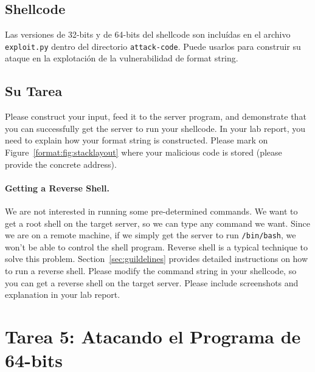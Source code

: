 \subsection{Shellcode} 



Las versiones de 32-bits y de 64-bits del shellcode son incluídas en el archivo \texttt{exploit.py} dentro del directorio \texttt{attack-code}. 
Puede usarlos para construir su ataque en la explotación de la vulnerabilidad de format string.


\subsection{Su Tarea} 

Please construct your input, feed it to the server program, and demonstrate that you can
successfully get the server to run your shellcode. 
In your lab report, you need to explain
how your format string is constructed. Please mark on Figure~\ref{format:fig:stacklayout} where 
your malicious code is stored (please provide the concrete address). 


\paragraph{Getting a Reverse Shell.}
We are not interested in running some pre-determined commands. We
want to get a root shell on the target server, so we can
type any command we want. Since we are on a remote machine,
if we simply get the server to run \texttt{/bin/bash}, we won't be able to
control the shell program. Reverse shell is a typical
technique to solve this problem. Section~\ref{sec:guildelines} provides
detailed instructions on how to run a reverse shell.
Please modify the command string in your shellcode, so you can
get a reverse shell on the target server.
Please include screenshots and explanation in your lab report.



\section{Tarea 5: Atacando el Programa de 64-bits}

